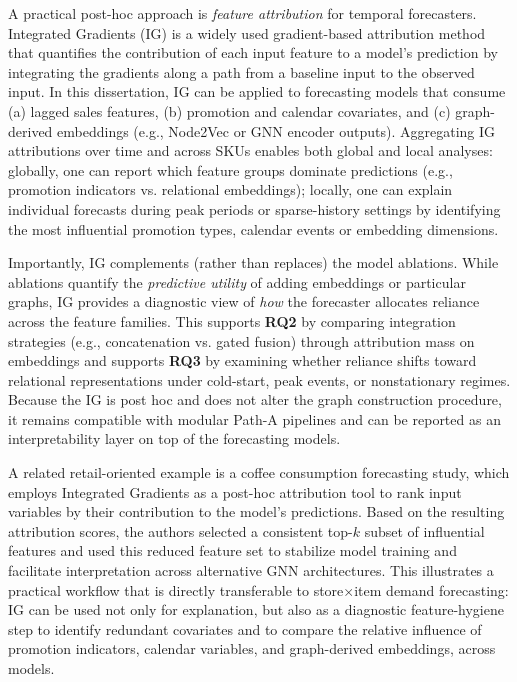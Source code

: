A practical post-hoc approach is \emph{feature attribution} for temporal forecasters. Integrated Gradients (IG) \cite{sundararajan2017axiomatic} is a widely used gradient-based attribution method that quantifies the contribution of each input feature to a model’s prediction by integrating the gradients along a path from a baseline input to the observed input. In this dissertation, IG can be applied to forecasting models that consume (a) lagged sales features, (b) promotion and calendar covariates, and (c) graph-derived embeddings (e.g., Node2Vec or GNN encoder outputs). Aggregating IG attributions over time and across SKUs enables both global and local analyses: globally, one can report which feature groups dominate predictions (e.g., promotion indicators vs. relational embeddings); locally, one can explain individual forecasts during peak periods or sparse-history settings by identifying the most influential promotion types, calendar events or embedding dimensions.

Importantly, IG complements (rather than replaces) the model ablations. While ablations quantify the \emph{predictive utility} of adding embeddings or particular graphs, IG provides a diagnostic view of \emph{how} the forecaster allocates reliance across the feature families. This supports \textbf{RQ2} by comparing integration strategies (e.g., concatenation vs. gated fusion) through attribution mass on embeddings and supports \textbf{RQ3} by examining whether reliance shifts toward relational representations under cold-start, peak events, or nonstationary regimes. Because the IG is post hoc and does not alter the graph construction procedure, it remains compatible with modular Path-A pipelines and can be reported as an interpretability layer on top of the forecasting models.

A related retail-oriented example is a coffee consumption forecasting study, which employs Integrated Gradients as a post-hoc attribution tool to rank input variables by their contribution to the model’s predictions. Based on the resulting attribution scores, the authors selected a consistent top-$k$ subset of influential features and used this reduced feature\cite{11268605} set to stabilize model training and facilitate interpretation across alternative GNN architectures. This illustrates a practical workflow that is directly transferable to store$\times$item demand forecasting: IG can be used not only for explanation, but also as a diagnostic feature-hygiene step to identify redundant covariates and to compare the relative influence of promotion indicators, calendar variables, and graph-derived embeddings, across models. 
